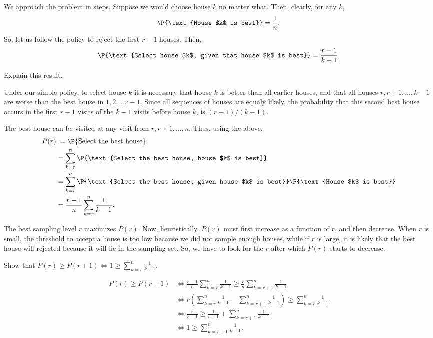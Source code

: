 \documentclass[a4paper]{article}
\begin{document}
We approach the problem in steps. Suppose we would choose house \(k\) no matter what. Then, clearly, for any \(k\),
\begin{align*}
\P{\text{House $k$ is best}} = \frac{1}{n}.
\end{align*}
So, let us follow the policy to reject the first \(r-1\) houses. Then,
\begin{align*}
\P{\text{Select house $k$, given that house $k$ is best}} = \frac{r-1}{k-1}.
\end{align*}

\begin{exercise}
Explain this result.
\begin{solution}
Under our simple policy, to select house \(k\) it is necessary that house \(k\) is better than all earlier houses, and that all houses \(r, r+1, \ldots, k-1\) are worse than the best house in \(1, 2, \ldots r-1\).
Since all sequences of houses are equaly likely, the probability that this second best house occurs in the first \(r-1\) visits of the \(k-1\) visits before house \(k\), is \((r-1)/(k-1)\).
\end{solution}
\end{exercise}

The best house can be visited at any visit from \(r, r+1, \ldots, n\). Thus, using the above,
\begin{align*}
P(r)&:=\P{\text{Select the best house}} \\
&= \sum_{k=r}^{n} \P{\text{Select the best house, house $k$ is best}} \\
&= \sum_{k=r}^{n} \P{\text{Select the best house, given house $k$ is best}} \P{\text{House $k$ is best}} \\
&= \frac{r-1}{n}\sum_{k=r}^{n} \frac{1}{k-1}.
\end{align*}

The best sampling level \(r\) maximizes \(P(r)\).
Now, heuristically, \(P(r)\) must first increase as a function of \(r\), and then decrease.
When \(r\) is small, the threshold to accept a house is too low because we did not sample enough houses, while if \(r\) is large, it is likely that the best house will rejected because it will lie in the sampling set.
So, we have to look for the \(r\) after which \(P(r)\) starts to decrease.

\begin{exercise}
Show that \(P(r) \geq P(r+1) \iff 1 \geq \sum_{k=r}^n \frac{1}{k-1}\).
\begin{solution}
\begin{align*}
P(r) \geq P(r+1)
&\iff \frac{r-1}{n} \sum_{k=r}^n \frac{1}{k-1} \geq \frac{r}{n} \sum_{k=r+1}^n \frac{1}{k-1} \\
&\iff r\left( \sum_{k=r}^n \frac{1}{k-1} - \sum_{k=r+1}^n \frac{1}{k-1} \right)  \geq  \sum_{k=r}^n \frac{1}{k-1} \\
&\iff \frac{r}{r-1} \geq  \frac{1}{r-1} + \sum_{k=r+1}^n \frac{1}{k-1}\\
&\iff 1 \geq  \sum_{k=r+1}^n \frac{1}{k-1}.
\end{align*}
\end{solution}
\end{exercise}
\end{document}
